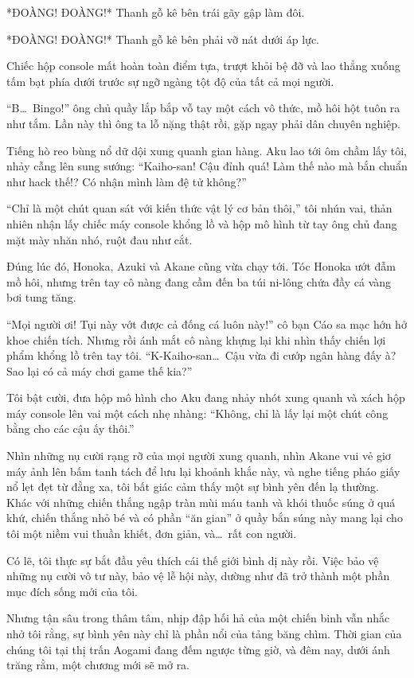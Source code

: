 \documentclass[../main.tex]{subfiles}
\begin{document}
*ĐOÀNG! ĐOÀNG!* Thanh gỗ kê bên trái gãy gập làm đôi.

*ĐOÀNG! ĐOÀNG!* Thanh gỗ kê bên phải vỡ nát dưới áp lực.

Chiếc hộp console mất hoàn toàn điểm tựa, trượt khỏi bệ đỡ và lao thẳng xuống tấm bạt phía dưới trước sự ngỡ ngàng tột độ của tất cả mọi người.

``B\dots\ Bingo!'' ông chủ quầy lắp bắp vỗ tay một cách vô thức, mồ hôi hột tuôn ra như tắm. Lần này thì ông ta lỗ nặng thật rồi, gặp ngay phải dân chuyên nghiệp.

Tiếng hò reo bùng nổ dữ dội xung quanh gian hàng. Aku lao tới ôm chầm lấy tôi, nhảy cẫng lên sung sướng: ``Kaiho-san! Cậu đỉnh quá! Làm thế nào mà bắn chuẩn như hack thế!? Có nhận mình làm đệ tử không?''

``Chỉ là một chút quan sát với kiến thức vật lý cơ bản thôi,'' tôi nhún vai, thản nhiên nhận lấy chiếc máy console khổng lồ và hộp mô hình từ tay ông chủ đang mặt mày nhăn nhó, ruột đau như cắt.

Đúng lúc đó, Honoka, Azuki và Akane cũng vừa chạy tới. Tóc Honoka ướt đẫm mồ hôi, nhưng trên tay cô nàng đang cầm đến ba túi ni-lông chứa đầy cá vàng bơi tung tăng.

``Mọi người ơi! Tụi này vớt được cả đống cá luôn này!'' cô bạn Cáo sa mạc hớn hở khoe chiến tích. Nhưng rồi ánh mắt cô nàng khựng lại khi nhìn thấy chiến lợi phẩm khổng lồ trên tay tôi. ``K-Kaiho-san\dots\ Cậu vừa đi cướp ngân hàng đấy à? Sao lại có cả máy chơi game thế kia?''

Tôi bật cười, đưa hộp mô hình cho Aku đang nhảy nhót xung quanh và xách hộp máy console lên vai một cách nhẹ nhàng: ``Không, chỉ là lấy lại một chút công bằng cho các cậu ấy thôi.''

Nhìn những nụ cười rạng rỡ của mọi người xung quanh, nhìn Akane vui vẻ giơ máy ảnh lên bấm tanh tách để lưu lại khoảnh khắc này, và nghe tiếng pháo giấy nổ lẹt đẹt từ đằng xa, tôi bất giác cảm thấy một sự bình yên đến lạ thường. Khác với những chiến thắng ngập tràn mùi máu tanh và khói thuốc súng ở quá khứ, chiến thắng nhỏ bé và có phần ``ăn gian'' ở quầy bắn súng này mang lại cho tôi một niềm vui thuần khiết, đơn giản, và\dots\ rất con người.

Có lẽ, tôi thực sự bắt đầu yêu thích cái thế giới bình dị này rồi. Việc bảo vệ những nụ cười vô tư này, bảo vệ lễ hội này, dường như đã trở thành một phần mục đích sống mới của tôi.

Nhưng tận sâu trong thâm tâm, nhịp đập hối hả của một chiến binh vẫn nhắc nhở tôi rằng, sự bình yên này chỉ là phần nổi của tảng băng chìm. Thời gian của chúng tôi tại thị trấn Aogami đang đếm ngược từng giờ, và đêm nay, dưới ánh trăng rằm, một chương mới sẽ mở ra.
\end{document}
